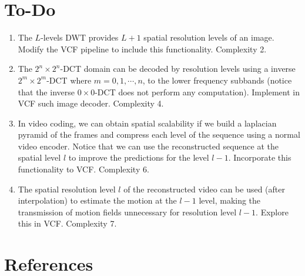 \section{To-Do}
\begin{enumerate}
\item The $L$-levels DWT provides $L+1$ spatial resolution levels of
  an image. Modify the VCF pipeline to include this
  functionality. Complexity 2.
\item The $2^n\times 2^n$-DCT domain can be decoded by resolution
  levels using a inverse $2^m\times 2^m$-DCT where $m=0,1,\cdots,n$,
  to the lower frequency subbands (notice that the inverse
  $0\times 0$-DCT does not perform any computation). Implement in VCF
  such image decoder. Complexity 4.
\item In video coding, we can obtain spatial scalability if we build a
  laplacian pyramid of the frames and compress each level of the
  sequence using a normal video encoder. Notice that we can use the
  reconstructed sequence at the spatial level $l$ to improve the
  predictions for the level $l-1$. Incorporate this functionality to
  VCF. Complexity 6.
\item The spatial resolution level $l$ of the reconstructed video can
  be used (after interpolation) to estimate the motion at the $l-1$
  level, making the transmission of motion fields unnecessary for
  resolution level $l-1$. Explore this in VCF. Complexity 7.
\end{enumerate}

\section{References}

\renewcommand{\addcontentsline}[3]{}%

